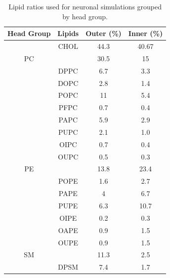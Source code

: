 \documentclass[preprint,3p,9pt,times,onecolumn]{elsarticle}
\begin{document}
\begin{table}
    \caption{Lipid ratios used for neuronal simulations grouped by head group.}
    \label{tab:rats}
    \centering

\begin{tabular}{|c||c|cc|}

\hline
Head Group & Lipids & Outer (\%) &{Inner (\%)} \\ \hline\hline
{}&CHOL                         & 44.3     & 40.67                         \\
\hline
PC &{} &30.5&15\\ \hline
{} &DPPC                         & 6.7      & 3.3                           \\
{} &DOPC                         & 2.8      & 1.4                           \\
{} &POPC                         & 11     & 5.4                         \\
{} &PFPC                         & 0.7      & 0.4                           \\
{} &PAPC                         & 5.9      & 2.9                           \\
{} &PUPC                         & 2.1      & 1.0                           \\
{} &OIPC                         & 0.7      & 0.4                           \\
{} &OUPC                         & 0.5      & 0.3                           \\
\hline
\hline
PE &{} &13.8&23.4\\ \hline
{} &POPE                         & 1.6      & 2.7                           \\
{} &PAPE                         & 4      & 6.7                           \\
{} &PUPE                         & 6.3      & 10.7                          \\
{} &OIPE                         & 0.2      & 0.3                           \\
{} &OAPE                         & 0.9      & 1.5                           \\
{} &OUPE                         & 0.9      & 1.5                          \\
\hline
\hline
SM &{} &11.3&2.5\\ \hline
{} &DPSM                         & 7.4      & 1.7                           \\

\end{tabular}
\end{table}
\end{document}
